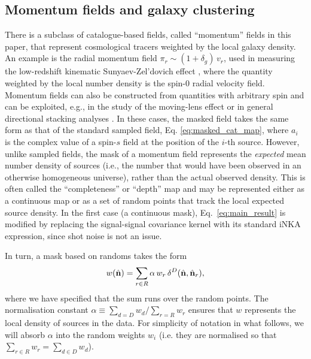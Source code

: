 \documentclass[%
 reprint,
superscriptaddress,
nofootinbib,
 amsmath,amssymb,
 aps,
 prd,
]{revtex4-2}
\newcommand{\nv}{\hat{\bf n}}
\begin{document}
  \subsection{Momentum fields and galaxy clustering}\label{ssec:theo.clust}
    There is a subclass of catalogue-based fields, called ``momentum'' fields in this paper, that represent cosmological tracers weighted by the local galaxy density. An example is the radial momentum field $\pi_r\sim (1+\delta_g)\,v_r$, used in measuring the low-redshift kinematic Sunyaev-Zel'dovich effect \cite{2512.14625,2604.19744}, where the quantity weighted by the local number density is the spin-0 radial velocity field. Momentum fields can also be constructed from quantities with arbitrary spin and can be exploited, e.g., in the study of the moving-lens effect or in general directional stacking analyses \cite{2605.15947,2605.18938}. In these cases, the masked field takes the same form as that of the standard sampled field, Eq. \ref{eq:masked_cat_map}, where $a_i$ is the complex value of a spin-$s$ field at the position of the $i$-th source. However, unlike sampled fields, the mask of a momentum field represents the \emph{expected} mean number density of sources (i.e., the number that would have been observed in an otherwise homogeneous universe), rather than the actual observed density. This is often called the ``completeness'' or ``depth'' map and may be represented either as a continuous map or as a set of random points that track the local expected source density. In the first case (a continuous mask), Eq.~\ref{eq:main_result} is modified by replacing the signal-signal covariance kernel with its standard iNKA expression, since shot noise is not an issue. 

    In turn, a mask based on randoms takes the form
    \begin{equation}
      w(\nv)=\sum_{r\in R} \alpha\,w_r\,\delta^D(\nv,\nv_r),
    \end{equation}
    where we have specified that the sum runs over the random points. The normalisation constant $\alpha\equiv\sum_{d=D}w_d/\sum_{r=R}w_r$ ensures that $w$ represents the local density of sources in the data. For simplicity of notation in what follows, we will absorb $\alpha$ into the random weights $w_i$ (i.e. they are normalised so that $\sum_{r\in R}w_r=\sum_{d\in D}w_d$).
    
\end{document}
